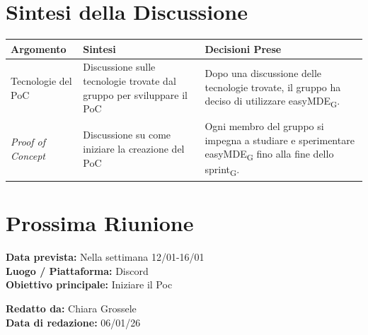 \documentclass[a4paper,12pt]{article}
\newcommand{\gls}[1]{#1\textsubscript{G}}
\begin{document}
\section*{ Sintesi della Discussione}

\begin{longtable}{|p{}|p{}|p{}|}
\hline
\textbf{Argomento} & \textbf{Sintesi} & \textbf{Decisioni Prese} \\ \hline
Tecnologie del PoC & Discussione sulle tecnologie trovate dal gruppo per sviluppare il PoC & Dopo una discussione delle tecnologie trovate, il gruppo ha deciso di utilizzare \gls{easyMDE}.\\ \hline
\textit{Proof of Concept} & Discussione su come iniziare la creazione del PoC & Ogni membro del gruppo si impegna a studiare e sperimentare \gls{easyMDE} fino alla fine dello \gls{sprint}. \\ \hline
\end{longtable}

\section*{ Prossima Riunione}
\textbf{Data prevista:} Nella settimana 12/01-16/01 \\
\textbf{Luogo / Piattaforma:} Discord \\
\textbf{Obiettivo principale:} Iniziare il Poc


\textbf{Redatto da:} Chiara Grossele \\
\textbf{Data di redazione:} 06/01/26
\end{document}
